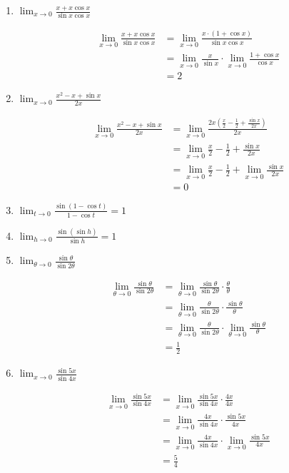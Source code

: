 \documentclass[a4paper, 12pt]{article}
\begin{document}
\begin{enumerate}
    \item $\lim_{x \to 0} \frac{x + x \cos x}{\sin x \cos x}$
    
    \begin{align*}
        \lim_{x \to 0} \frac{x + x \cos x}{\sin x \cos x} &= \lim_{x \to 0} \frac{x\cdot(1 + \cos x)}{\sin x \cos x}\\
        &=\lim_{x \to 0} \frac{x}{\sin x} \cdot \lim_{x \to 0}\frac{1 + \cos x}{\cos x}\\
        &= 2
    \end{align*}

    \item $\lim_{x \to 0} \frac{x^2 - x + \sin x}{2x}$
    
    \begin{align*}
        \lim_{x \to 0} \frac{x^2 - x + \sin x}{2x} &= \lim_{x \to 0} \frac{2x(\frac{x}{2} - \frac{1}{2} + \frac{\sin x}{2x})}{2x} \\
        &= \lim_{x \to 0} \frac{x}{2} - \frac{1}{2} + \frac{\sin x}{2x} \\
        &= \lim_{x \to 0} \frac{x}{2} - \frac{1}{2} + \lim_{x \to 0}\frac{\sin x}{2x}\\
        &= 0
    \end{align*}

    \item $\lim_{t \to 0} \frac{\sin(1 -\cos t)}{1-\cos t} = 1$
    \item $\lim_{h \to 0} \frac{\sin(\sin h)}{\sin h} = 1$
    \item $\lim_{\theta \to 0} \frac{\sin \theta}{\sin 2\theta}$
    
    \begin{align*}
        \lim_{\theta \to 0} \frac{\sin \theta}{\sin 2\theta} &= \lim_{\theta \to 0} \frac{\sin \theta}{\sin 2\theta} \cdot \frac{\theta}{\theta}\\
        &= \lim_{\theta \to 0} \frac{\theta}{\sin 2\theta} \cdot \frac{\sin \theta}{\theta}\\
        &= \lim_{\theta \to 0}\frac{\theta}{\sin 2\theta} \cdot \lim_{\theta \to 0}\frac{\sin \theta}{\theta}\\
        &= \frac{1}{2}
    \end{align*}

    \item $\lim_{x \to 0} \frac{\sin 5x}{\sin 4x}$
    
    \begin{align*}
        \lim_{x \to 0} \frac{\sin 5x}{\sin 4x} &= \lim_{x \to 0} \frac{\sin 5x}{\sin 4x} \cdot \frac{4x}{4x}\\
        &=\lim_{x \to 0} \frac{4x}{\sin 4x} \cdot \frac{\sin 5x}{4x}\\
        &= \lim_{x \to 0} \frac{4x}{\sin 4x} \cdot \lim_{x \to 0}\frac{\sin 5x}{4x}\\
        &=\frac{5}{4}
    \end{align*}


\end{enumerate}
\end{document}
